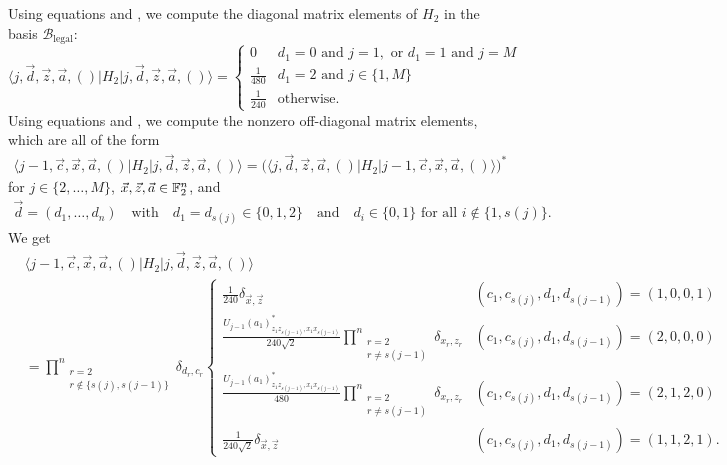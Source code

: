 \documentclass[../thesis-main/thesis-main]{subfiles}
\begin{document}
Using equations  and , we compute the diagonal matrix elements of $H_{2}$ in the basis $\mathcal{B}_{{\text{legal}}}$:
\begin{equation}
\langle j,\vec{d},\vec{z},\vec{a},()|H_{2}|j,\vec{d},\vec{z},\vec{a},()\rangle=\begin{cases}
0 & d_{1}=0\text{ and }j=1,\text{ or }d_{1}=1\text{ and }j=M\\
\frac{1}{480} & d_{1}=2\text{ and }j\in\{1,M\}\\
\frac{1}{240} & \text{otherwise.}
\end{cases}\label{eq:diag_H2_legalbasis}
\end{equation}
Using equations  and , we compute the nonzero off-diagonal matrix elements, which are all of the form 
\begin{align}
\langle j-1,\vec{c},\vec{x},\vec{a},()|H_{2}|j,\vec{d},\vec{z},\vec{a},()\rangle = 
\big(\langle j,\vec{d},\vec{z},\vec{a},()|H_{2}|j-1,\vec{c},\vec{x},\vec{a},()\rangle\big)^*
\end{align}
for $j\in\{2,\ldots,M\}$, $\vec{x},\vec{z},\vec{a}\in\mathbb{F}_2^{n}$, and
\begin{align}
\vec{d}=(d_{1},\ldots,d_{n})\quad\text{with}\quad d_{1}=d_{s(j)}\in\{0,1,2\}\quad\text{and}\quad d_{i}\in\{0,1\} \text{ for all } i\notin\{1,s(j)\}.
\end{align}
We get
\begin{align}
&\langle j-1,\vec{c},\vec{x},\vec{a},()|H_{2}|j,\vec{d},\vec{z},\vec{a},()\rangle \nonumber\\
&= \underset{\substack{r=2\\
r\notin\{s(j),s(j-1)\}
}
}{\overset{n}{\prod}}\delta_{d_{r},c_{r}} \begin{cases}
\frac{1}{240}\delta_{\vec{x},\vec{z}} & (c_{1},c_{s(j)},d_{1},d_{s(j-1)})=(1,0,0,1)\\
\frac{U_{j-1}(a_{1})^{*}_{z_{1}z_{s(j-1)},x_{1}x_{s(j-1)}}}{240\sqrt{2}}  \underset{\substack{r=2\\
r\neq s(j-1)
}
}{\overset{n}{\prod}}\delta_{x_{r},z_{r}} & (c_{1},c_{s(j)},d_{1},d_{s(j-1)})=(2,0,0,0)\\
\frac{U_{j-1}(a_{1})^{*}_{z_{1}z_{s(j-1)},x_{1}x_{s(j-1)}}}{480}  \underset{\substack{r=2\\
r\neq s(j-1)
}
}{\overset{n}{\prod}}\delta_{x_{r},z_{r}} & (c_{1},c_{s(j)},d_{1},d_{s(j-1)})=(2,1,2,0)\\
\frac{1}{240\sqrt{2}}\delta_{\vec{x},\vec{z}} & (c_{1},c_{s(j)},d_{1},d_{s(j-1)})=(1,1,2,1).
\end{cases}
\label{eq:H2_offdiag_legalbasis}
\end{align}
\end{document}
